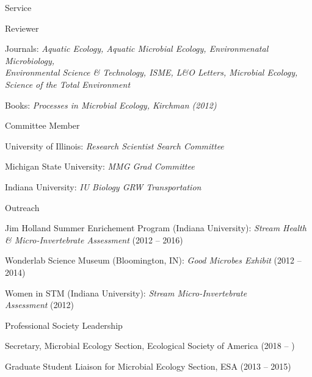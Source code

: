 \documentclass{resume} %
\begin{document}

\begin{rSection}{Service}

    \begin{rSubsection}{Reviewer}{}{}{}
        \item Journals: {\em Aquatic Ecology, Aquatic Microbial Ecology, Environmenatal Microbiology, \\Environmental Science \& Technology, ISME, L\&O Letters, Microbial Ecology, \\
             Science of the Total Environment}
        \item Books: {\em Processes in Microbial Ecology, Kirchman (2012)}
    \end{rSubsection}

    \begin{rSubsection}{Committee Member}{}{}{}
        \item University of Illinois: {\em Research Scientist Search Committee}
        \item Michigan State University: {\em MMG Grad Committee}
        \item Indiana University: {\em IU Biology GRW Transportation}
    \end{rSubsection}

    \begin{rSubsection}{Outreach}{}{}{}
        \item Jim Holland Summer Enrichement Program (Indiana University):
        {\em Stream Health \& Micro-Invertebrate Assessment} (2012 -- 2016)
        \item Wonderlab Science Museum (Bloomington, IN): {\em Good Microbes
        Exhibit} (2012 -- 2014)
        \item Women in STM (Indiana University): {\em Stream Micro-Invertebrate
        \\ Assessment} (2012)
    \end{rSubsection}

    \begin{rSubsection}{Professional Society Leadership}{}{}{}
        \item Secretary, Microbial Ecology Section, Ecological Society of America (2018 -- )
        \item Graduate Student Liaison for Microbial Ecology Section, ESA
              (2013 -- 2015)
    \end{rSubsection}


\end{rSection}
\end{document}
